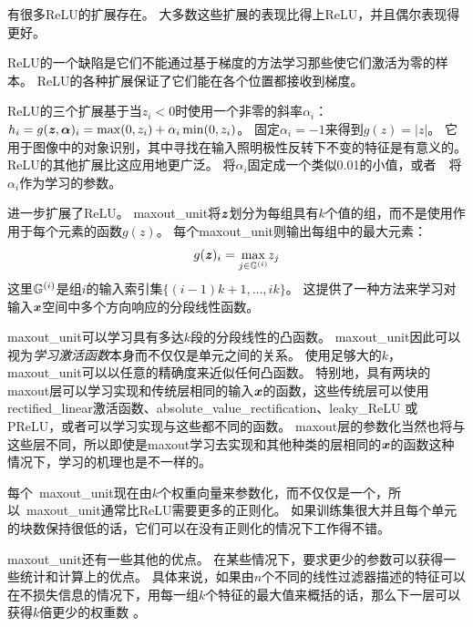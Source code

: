 有很多\gls{ReLU}的扩展存在。
大多数这些扩展的表现比得上\gls{ReLU}，并且偶尔表现得更好。

\gls{ReLU}的一个缺陷是它们不能通过基于梯度的方法学习那些使它们激活为零的样本。
\gls{ReLU}的各种扩展保证了它们能在各个位置都接收到梯度。

\gls{ReLU}的三个扩展基于当$z_i<0$时使用一个非零的斜率$\alpha_i$：$h_i =g(\boldsymbol{\mathit{z}}, \boldsymbol{\alpha})_i = \max(0, z_i) + \alpha_i \min(0, z_i)$。
固定$\alpha_i=-1$来得到$g(z)=|z|$。
它用于图像中的对象识别\citep{Jarrett-ICCV2009}，其中寻找在输入照明极性反转下不变的特征是有意义的。
\gls{ReLU}的其他扩展比这应用地更广泛。
\citep{Maas-et-al-ICML2013}将$\alpha_i$固定成一个类似0.01的小值，或者~\textbf{}~将$\alpha_i$作为学习的参数\citep{He-et-al-arxiv2015}。


\citep{Goodfellow_maxout_2013}进一步扩展了\gls{ReLU}。
\gls{maxout_unit}将$\boldsymbol{\mathit{z}}$划分为每组具有$k$个值的组，而不是使用作用于每个元素的函数$g(z)$。
每个\gls{maxout_unit}则输出每组中的最大元素：
\begin{equation}
g(\boldsymbol{\mathit{z}})_i = \underset{j\in \mathbb{G}^{(i)}}{\max} z_j
\end{equation}
这里$\mathbb{G}^{(i)}$是组$i$的输入索引集$\{(i-1)k+1, \ldots, ik\}$。
这提供了一种方法来学习对输入$\boldsymbol{\mathit{x}}$空间中多个方向响应的分段线性函数。

\gls{maxout_unit}可以学习具有多达$k$段的分段线性的凸函数。
\gls{maxout_unit}因此可以视为\emph{学习激活函数}本身而不仅仅是单元之间的关系。
使用足够大的$k$，\gls{maxout_unit}可以以任意的精确度来近似任何凸函数。
特别地，具有两块的maxout层可以学习实现和传统层相同的输入$\boldsymbol{\mathit{x}}$的函数，这些传统层可以使用\gls{rectified_linear}激活函数、\gls{absolute_value_rectification}、\gls{leaky_ReLU} 或\gls{PReLU}，或者可以学习实现与这些都不同的函数。
maxout层的参数化当然也将与这些层不同，所以即使是maxout学习去实现和其他种类的层相同的$\boldsymbol{\mathit{x}}$的函数这种情况下，学习的机理也是不一样的。

每个~\gls{maxout_unit}现在由$k$个权重向量来参数化，而不仅仅是一个，所以~\gls{maxout_unit}通常比\gls{ReLU}需要更多的正则化。
如果训练集很大并且每个单元的块数保持很低的话，它们可以在没有正则化的情况下工作得不错\citep{cai2013deep}。

\gls{maxout_unit}还有一些其他的优点。
在某些情况下，要求更少的参数可以获得一些统计和计算上的优点。
具体来说，如果由$n$个不同的线性过滤器描述的特征可以在不损失信息的情况下，用每一组$k$个特征的最大值来概括的话，那么下一层可以获得$k$倍更少的权重数 。

